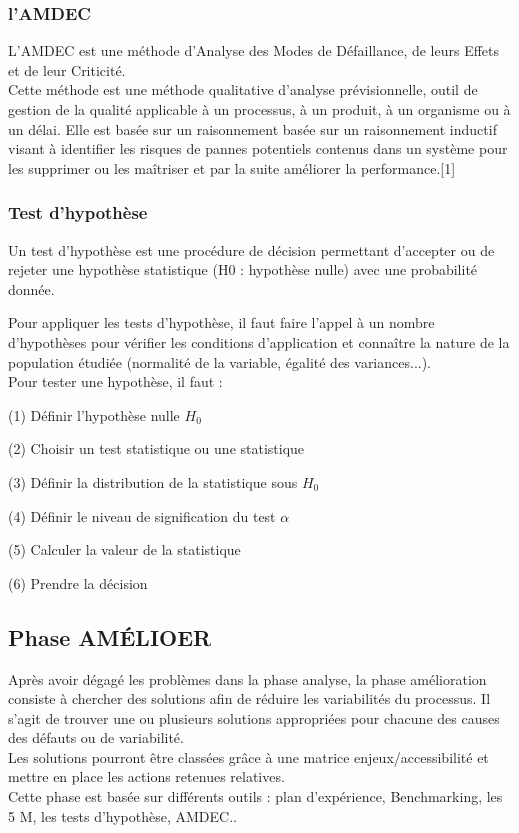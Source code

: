 \documentclass[12pt, a4paper]{thesis}
\begin{document}
\subsubsection{l'AMDEC}
L'AMDEC est une méthode d'Analyse des Modes de Défaillance, de leurs Effets et de leur Criticité.\\
Cette méthode est une méthode qualitative d'analyse prévisionnelle, outil de gestion de la qualité applicable à un processus, à un produit, à un organisme ou à un délai. Elle est basée sur un raisonnement basée sur un raisonnement inductif visant à identifier les risques de pannes potentiels contenus dans un système pour les supprimer ou les maîtriser et par la suite améliorer la performance.[1]







\subsubsection{Test d'hypothèse}

Un test d'hypothèse est une procédure de décision permettant d'accepter ou de rejeter une hypothèse statistique (H0 : hypothèse nulle) avec une probabilité donnée.

Pour appliquer les tests d'hypothèse, il faut faire l'appel à un nombre d'hypothèses pour vérifier les conditions d'application et connaître la nature de la population étudiée (normalité de la variable, égalité des variances...).\\
Pour tester une hypothèse, il faut :

(1) Définir l'hypothèse nulle $H_{0}$

(2) Choisir un test statistique ou une statistique

(3) Définir la distribution de la statistique sous $H_{0}$

(4) Définir le niveau de signification du test $\alpha$

(5) Calculer la valeur de la statistique

(6) Prendre la décision





\subsection{Phase AMÉLIOER}

Après avoir dégagé les problèmes dans la phase analyse, la phase amélioration consiste à chercher des solutions afin de réduire les variabilités du processus. Il s’agit de trouver une ou plusieurs solutions appropriées pour chacune des causes des défauts ou de variabilité. \\
Les solutions pourront être classées grâce à une matrice enjeux/accessibilité et mettre en place les actions retenues relatives.\\
Cette phase est basée sur différents outils : plan d'expérience, Benchmarking, les 5 M, les tests d'hypothèse, AMDEC.. 
\end{document}
